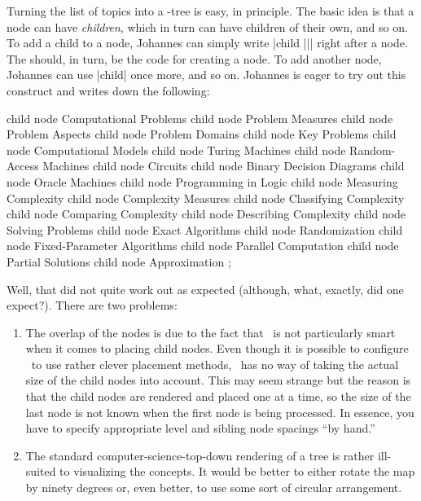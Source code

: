 Turning the list of topics into a \tikzname-tree is easy, in
principle. The basic idea is that a node can have \emph{children},
which in turn can have children of their own, and so on. To add a
child to a node, Johannes can simply write |child {||}|
right after a node. The  should, in turn, be the code for
creating a node. To add another node, Johannes can use |child| once
more, and so on. Johannes is eager to try out this construct and
writes down the following:

\begin{codeexample}[]
\tikz
    child { node {Computational Problems}
      child { node {Problem Measures} }
      child { node {Problem Aspects} }
      child { node {Problem Domains} }
      child { node {Key Problems} }
    }
    child { node {Computational Models}
      child { node {Turing Machines} }
      child { node {Random-Access Machines} }
      child { node {Circuits} }
      child { node {Binary Decision Diagrams} }
      child { node {Oracle Machines} }
      child { node {Programming in Logic} }
    }
    child { node {Measuring Complexity} 
      child { node {Complexity Measures} }
      child { node {Classifying Complexity} }
      child { node {Comparing Complexity} }
      child { node {Describing Complexity} }
    }
    child { node {Solving Problems}
      child { node {Exact Algorithms} }
      child { node {Randomization} }
      child { node {Fixed-Parameter Algorithms} }
      child { node {Parallel Computation} }
      child { node {Partial Solutions} }
      child { node {Approximation} }
    };    
\end{codeexample}

Well, that did not quite work out as expected (although, what,
exactly, did one expect?). There are two problems:
\begin{enumerate}
\item The overlap of the nodes is due to the fact that \tikzname\ is
  not particularly smart when it comes to placing child nodes. Even
  though it is possible to configure \tikzname\ to use rather clever
  placement methods, \tikzname\ has no way of taking the actual size
  of the child nodes into account. This may seem strange but the
  reason is that the child nodes are rendered and placed one at a
  time, so the size of the last node is not known when the first node
  is being processed. In essence, you have to specify appropriate
  level and sibling node spacings ``by hand.''
\item The standard computer-science-top-down rendering of a tree is
  rather ill-suited to visualizing the concepts. It would be better to
  either rotate the map by ninety degrees or, even better, to use some
  sort of circular arrangement.
\end{enumerate}

